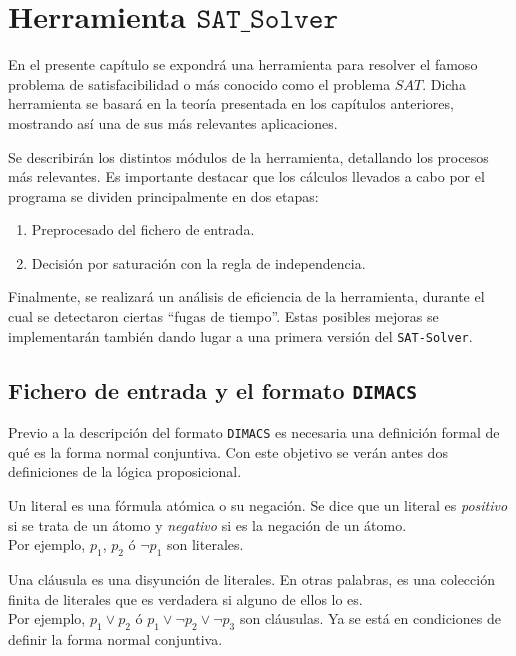 \chapter{Herramienta $\mathtt{SAT\_Solver}$}

En el presente capítulo se expondrá una herramienta para resolver el famoso problema de satisfacibilidad o más conocido como el problema $SAT$. Dicha herramienta se basará en la teoría presentada en los capítulos anteriores, mostrando así una de sus más relevantes aplicaciones. 

Se describirán los distintos módulos de la herramienta, detallando los procesos más relevantes. Es importante destacar que los cálculos llevados a cabo por el programa se dividen principalmente en dos etapas:
\begin{enumerate}
\item Preprocesado del fichero de entrada.
\item Decisión por saturación con la regla de independencia.
\end{enumerate}

Finalmente, se realizará un análisis de eficiencia de la herramienta, durante el cual se detectaron ciertas ``fugas de tiempo''. Estas posibles mejoras se implementarán también dando lugar a una primera versión del \texttt{SAT-Solver}.

\section{Fichero de entrada y el formato \texttt{DIMACS}}
Previo a la descripción del formato \texttt{DIMACS} es necesaria una definición formal de qué es la forma normal conjuntiva. Con este objetivo se verán antes dos definiciones de la lógica proposicional.

 Un literal es una fórmula atómica o su negación. Se dice que un literal es \textit{positivo} si se trata de un átomo y \textit{negativo} si es la negación de un átomo.\\

Por ejemplo, $p_1$, $p_2$ ó $\neg p_1$ son literales.

 Una cláusula es una disyunción de literales. En otras palabras, es una colección finita de literales que es verdadera si alguno de ellos lo es. \\

Por ejemplo, $p_1 \vee p_2$ ó $p_1 \vee \neg p_2 \vee \neg p_3$ son cláusulas. Ya se está en condiciones de definir la forma normal conjuntiva.

